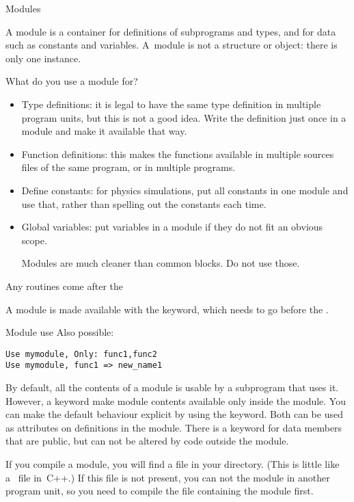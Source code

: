  {Modules}
\label{sec:modulef}

A module is a container for definitions of subprograms and types, and
for data such as constants and variables. A~module is not a 
structure or object: there is only one instance.

What do you use a module for?
\begin{itemize}
\item Type definitions: it is legal to have the same type definition
  in multiple program units, but this is not a good idea. 
  Write the definition just once in a module and make it available
  that way.
\item Function definitions: this makes the functions available in multiple
  sources files of the same program, or in multiple programs.
\item Define constants: for physics simulations, put all constants in
  one module and use that, rather than spelling out the constants each
  time.
\item Global variables: put variables in a module if they do not fit
  an obvious scope.
  \begin{f77note}
  Modules are much cleaner than common blocks. Do not use those.
  \end{f77note}
\end{itemize}
%

Any routines come after the 

A module is made available with the  keyword, which
needs to go before the .
%
\begin{block}{Module use}
  \label{sl:moduleuse}
  Also possible:
\begin{verbatim}
Use mymodule, Only: func1,func2
Use mymodule, func1 => new_name1
\end{verbatim}
\end{block}

By default, all the contents of a module is usable by a subprogram
that uses it. However, a keyword  make module
contents available only inside the module.
You can make the default behaviour explicit by using the
 keyword. Both  can be used as
attributes on definitions in the module.
There is a keyword  for data members that
are public, but can not be altered by code outside the module.

If you compile a module, you will find a  file in your
directory. (This is little like a~ file in~C++.)
If this file is not present, you can not  the module in another
program unit, so you need to compile the file containing the module
first.

